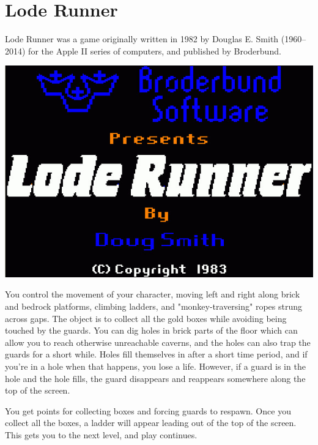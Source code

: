 \documentclass[10pt]{report}%
\begin{document}
\pagestyle{noweb}

\chapter{Lode Runner}

Lode Runner was a game originally written in 1982 by Douglas E. Smith (1960--2014) for
the Apple II series of computers, and published by Broderbund.

\begin{center}
\includegraphics[width=\columnwidth]{title-screen}
\end{center}

You control the movement of your character, moving left and right along brick
and bedrock platforms, climbing ladders,
and "monkey-traversing" ropes strung across gaps. The object is to collect all the
gold boxes while avoiding being touched by the guards. You can dig holes in
brick parts of the floor which can allow you to reach otherwise unreachable caverns,
and the holes can also trap the guards for a short while. Holes fill themselves in
after a short time period, and if you're in a hole when that happens, you lose
a life. However, if a guard is in the hole and the hole fills, the guard disappears and
reappears somewhere along the top of the screen.

You get points for collecting boxes and forcing guards to respawn. Once you collect
all the boxes, a ladder will appear leading out of the top of the screen. This
gets you to the next level, and play continues.
\end{document}
